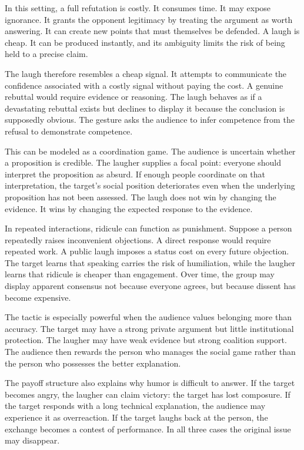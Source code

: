 ﻿\documentclass[12pt,a4paper]{book}
\begin{document}
In this setting, a full refutation is costly. It consumes time. It may expose ignorance. It grants the opponent legitimacy by treating the argument as worth answering. It can create new points that must themselves be defended. A laugh is cheap. It can be produced instantly, and its ambiguity limits the risk of being held to a precise claim.

The laugh therefore resembles a cheap signal. It attempts to communicate the confidence associated with a costly signal without paying the cost. A genuine rebuttal would require evidence or reasoning. The laugh behaves as if a devastating rebuttal exists but declines to display it because the conclusion is supposedly obvious. The gesture asks the audience to infer competence from the refusal to demonstrate competence.

This can be modeled as a coordination game. The audience is uncertain whether a proposition is credible. The laugher supplies a focal point: everyone should interpret the proposition as absurd. If enough people coordinate on that interpretation, the target's social position deteriorates even when the underlying proposition has not been assessed. The laugh does not win by changing the evidence. It wins by changing the expected response to the evidence.

In repeated interactions, ridicule can function as punishment. Suppose a person repeatedly raises inconvenient objections. A direct response would require repeated work. A public laugh imposes a status cost on every future objection. The target learns that speaking carries the risk of humiliation, while the laugher learns that ridicule is cheaper than engagement. Over time, the group may display apparent consensus not because everyone agrees, but because dissent has become expensive.

The tactic is especially powerful when the audience values belonging more than accuracy. The target may have a strong private argument but little institutional protection. The laugher may have weak evidence but strong coalition support. The audience then rewards the person who manages the social game rather than the person who possesses the better explanation.

The payoff structure also explains why humor is difficult to answer. If the target becomes angry, the laugher can claim victory: the target has lost composure. If the target responds with a long technical explanation, the audience may experience it as overreaction. If the target laughs back at the person, the exchange becomes a contest of performance. In all three cases the original issue may disappear.
\end{document}
